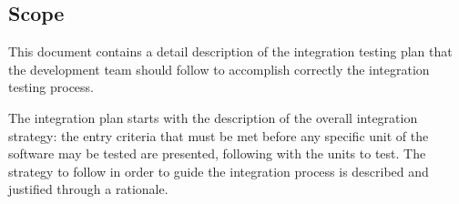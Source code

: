 \subsection{Scope}

This document contains a detail description of the integration testing plan that the development team should follow to accomplish correctly the integration testing process.

The integration plan starts with the description of the overall integration strategy: the entry criteria that must be met before any specific unit of the software may be tested are presented, following with the units to test. The strategy to follow in order to guide the integration process is described and justified through a rationale.

